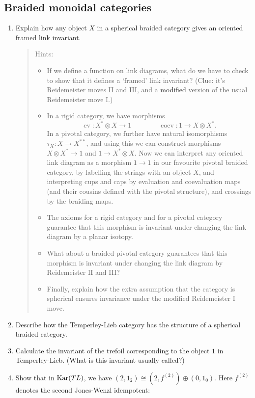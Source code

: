 \documentclass[12pt]{amsart}
\begin{document}
\subsection{Braided monoidal categories}
\begin{enumerate}
\item Explain how any object $X$ in a spherical braided category gives an oriented framed link invariant.
\begin{quote}
Hints:
\begin{itemize}
\item If we define a function on link diagrams, what do we have to check to show that it defines a `framed' link invariant? (Clue: it's Reidemeister moves II and III, and a \href{https://en.wikipedia.org/wiki/Reidemeister_move}{modified} version of the usual Reidemeister move I.)
\item In a rigid category, we have morphisms $$\operatorname{ev}: X^* \otimes X \to 1 \qquad \qquad \operatorname{coev}: 1 \to X \otimes X^*.$$ In a pivotal category, we further have natural isomorphisms $\tau_X : X \to X^{**}$, and using this we can construct morphisms $X \otimes X^* \to 1$ and $1 \to X^* \otimes X$. Now we can interpret any oriented link diagram as a morphism $1 \to 1$ in our favourite pivotal braided category, by labelling the strings with an object $X$, and interpreting cups and caps by evaluation and coevaluation maps (and their cousins defined with the pivotal structure), and crossings by the braiding maps.
\item The axioms for a rigid category and for a pivotal category guarantee that this morphism is invariant under changing the link diagram by a planar isotopy.
\item What about a braided pivotal category guarantees that this morphism is invariant under changing the link diagram by Reidemeister II and III?
\item Finally, explain how the extra assumption that the category is spherical ensures invariance under the modified Reidemeister I move.
\end{itemize}
\end{quote}
\item Describe how the Temperley-Lieb category has the structure of a spherical braided category.
\item Calculate the invariant of the trefoil corresponding to the object $1$ in Temperley-Lieb. (What is this invariant usually called?)
\item Show that in $\operatorname{Kar}(TL)$, we have $(2,1_2) \cong (2,f^{(2)}) \oplus (0, 1_0)$. Here $f^{(2)}$ denotes the second Jones-Wenzl idempotent:
\newcommand{\cupcap}{\begin{tikzpicture}[baseline=-0.5ex,scale=0.8]
	\draw (45:.8cm) to [curve through=(90:.3cm)] (135:.8cm);
	\draw (-45:.8cm) to [curve through=(-90:.3cm)] (-135:.8cm);
\end{tikzpicture}}


\end{enumerate}
\end{document}
